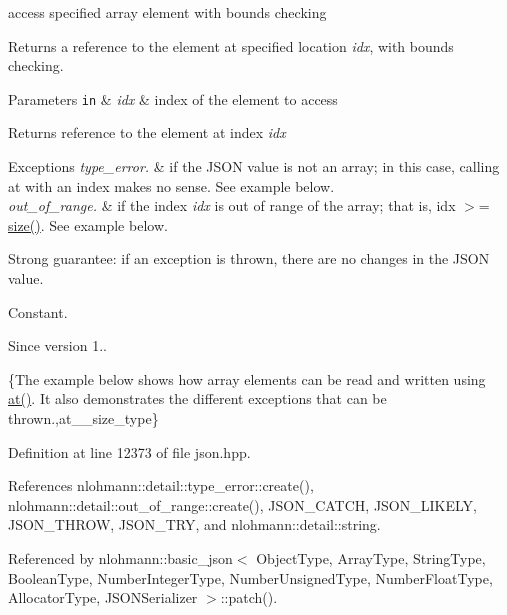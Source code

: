access specified array element with bounds checking 

Returns a reference to the element at specified location {\itshape idx}, with bounds checking.


\begin{DoxyParams}[1]{Parameters}
\mbox{\tt in}  & {\em idx} & index of the element to access\\
\hline
\end{DoxyParams}
\begin{DoxyReturn}{Returns}
reference to the element at index {\itshape idx} 
\end{DoxyReturn}

\begin{DoxyExceptions}{Exceptions}
{\em type\+\_\+error.} & if the J\+S\+ON value is not an array; in this case, calling {\ttfamily at} with an index makes no sense. See example below. \\
\hline
{\em out\+\_\+of\+\_\+range.} & if the index {\itshape idx} is out of range of the array; that is, {\ttfamily idx $>$= \hyperlink{classnlohmann_1_1basic__json_a25e27ad0c6d53c01871c5485e1f75b96}{size()}}. See example below.\\
\hline
\end{DoxyExceptions}
Strong guarantee\+: if an exception is thrown, there are no changes in the J\+S\+ON value.

Constant.

\begin{DoxySince}{Since}
version 1..
\end{DoxySince}
\{The example below shows how array elements can be read and written using {\ttfamily \hyperlink{classnlohmann_1_1basic__json_a73ae333487310e3302135189ce8ff5d8}{at()}}. It also demonstrates the different exceptions that can be thrown.,at\+\_\+\+\_\+size\+\_\+type\} 

Definition at line 12373 of file json.\+hpp.



References nlohmann\+::detail\+::type\+\_\+error\+::create(), nlohmann\+::detail\+::out\+\_\+of\+\_\+range\+::create(), J\+S\+O\+N\+\_\+\+C\+A\+T\+CH, J\+S\+O\+N\+\_\+\+L\+I\+K\+E\+LY, J\+S\+O\+N\+\_\+\+T\+H\+R\+OW, J\+S\+O\+N\+\_\+\+T\+RY, and nlohmann\+::detail\+::string.



Referenced by nlohmann\+::basic\+\_\+json$<$ Object\+Type, Array\+Type, String\+Type, Boolean\+Type, Number\+Integer\+Type, Number\+Unsigned\+Type, Number\+Float\+Type, Allocator\+Type, J\+S\+O\+N\+Serializer $>$\+::patch().


